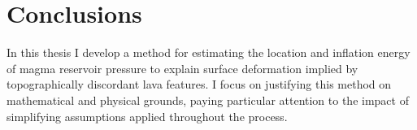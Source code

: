 \chapter{Conclusions}

In this thesis I develop a method for estimating the location and inflation energy of magma reservoir pressure to explain surface deformation implied by topographically discordant lava features. I focus on justifying this method on mathematical and physical grounds, paying particular attention to the impact of simplifying assumptions applied throughout the process.